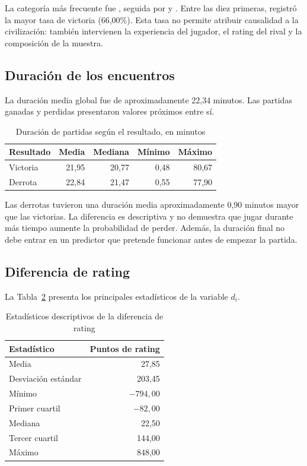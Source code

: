 \documentclass[12pt,a4paper]{article}
\begin{document}
La categoría más frecuente fue , seguida por  y . Entre las diez primeras,  registró la mayor tasa de victoria (66,00\%). Esta tasa no permite atribuir causalidad a la civilización: también intervienen la experiencia del jugador, el rating del rival y la composición de la muestra.

\subsection{Duración de los encuentros}

La duración media global fue de aproximadamente 22,34 minutos. Las partidas ganadas y perdidas presentaron valores próximos entre sí.

\begin{table}[htbp]
\centering\small
\caption{Duración de partidas según el resultado, en minutos}
\label{tab:duracion}
\begin{tabular}{lrrrr}
\toprule
\textbf{Resultado} & \textbf{Media} & \textbf{Mediana} & \textbf{Mínimo} & \textbf{Máximo}\\
\midrule
Victoria & 21,95 & 20,77 & 0,48 & 80,67\\
Derrota & 22,84 & 21,47 & 0,55 & 77,90\\
\bottomrule
\end{tabular}
\end{table}

Las derrotas tuvieron una duración media aproximadamente 0,90 minutos mayor que las victorias. La diferencia es descriptiva y no demuestra que jugar durante más tiempo aumente la probabilidad de perder. Además, la duración final no debe entrar en un predictor que pretende funcionar antes de empezar la partida.

\subsection{Diferencia de rating}

La Tabla~\ref{tab:rating} presenta los principales estadísticos de la variable $d_i$.
\begin{table}[htbp]
\centering
\caption{Estadísticos descriptivos de la diferencia de rating}
\label{tab:rating}
\begin{tabular}{lr}
\toprule
\textbf{Estadístico} & \textbf{Puntos de rating}\\
\midrule
Media & 27,85\\
Desviación estándar & 203,45\\
Mínimo & $-794,00$\\
Primer cuartil & $-82,00$\\
Mediana & 22,50\\
Tercer cuartil & 144,00\\
Máximo & 848,00\\
\bottomrule
\end{tabular}
\end{table}
\end{document}
